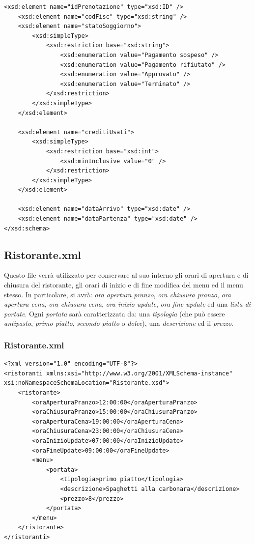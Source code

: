 \documentclass [a4paper, 12pt]{book}
\begin{document}
\begin{lstlisting}[style=XML]
    <xsd:element name="idPrenotazione" type="xsd:ID" />
    <xsd:element name="codFisc" type="xsd:string" />
    <xsd:element name="statoSoggiorno">
        <xsd:simpleType>
            <xsd:restriction base="xsd:string">
                <xsd:enumeration value="Pagamento sospeso" />
                <xsd:enumeration value="Pagamento rifiutato" />
                <xsd:enumeration value="Approvato" />
                <xsd:enumeration value="Terminato" />
            </xsd:restriction>
        </xsd:simpleType>
    </xsd:element>

    <xsd:element name="creditiUsati">
        <xsd:simpleType>
            <xsd:restriction base="xsd:int">
                <xsd:minInclusive value="0" />
            </xsd:restriction>
        </xsd:simpleType>
    </xsd:element>

    <xsd:element name="dataArrivo" type="xsd:date" />
    <xsd:element name="dataPartenza" type="xsd:date" />
</xsd:schema>
\end{lstlisting}
\subsection{Ristorante.xml}
Questo file verrà utilizzato per conservare al suo interno gli orari di apertura e di chiusura del ristorante, gli orari di inizio e di fine modifica del menu ed il menu stesso. In particolare, si avrà: \textit{ora apertura pranzo}, \textit{ora chiusura pranzo}, \textit{ora apertura cena}, \textit{ora chiusura cena}, \textit{ora inizio update}, \textit{ora fine update} ed una \textit{lista di portate}. Ogni \textit{portata} sarà caratterizzata da:
una \textit{tipologia} (che può essere \textit{antipasto}, \textit{primo piatto}, \textit{secondo piatto} o \textit{dolce}), una \textit{descrizione} ed il \textit{prezzo}.
\subsubsection{Ristorante.xml}
\begin{lstlisting}[style=XML]
<?xml version="1.0" encoding="UTF-8"?>
<ristoranti xmlns:xsi="http://www.w3.org/2001/XMLSchema-instance" xsi:noNamespaceSchemaLocation="Ristorante.xsd">
    <ristorante>
        <oraAperturaPranzo>12:00:00</oraAperturaPranzo>
        <oraChiusuraPranzo>15:00:00</oraChiusuraPranzo>
        <oraAperturaCena>19:00:00</oraAperturaCena>
        <oraChiusuraCena>23:00:00</oraChiusuraCena>
        <oraInizioUpdate>07:00:00</oraInizioUpdate>
        <oraFineUpdate>09:00:00</oraFineUpdate>     
        <menu>
            <portata>
                <tipologia>primo piatto</tipologia>
                <descrizione>Spaghetti alla carbonara</descrizione>
                <prezzo>8</prezzo>
            </portata>
        </menu>
    </ristorante>
</ristoranti>
\end{lstlisting}
\end{document}

